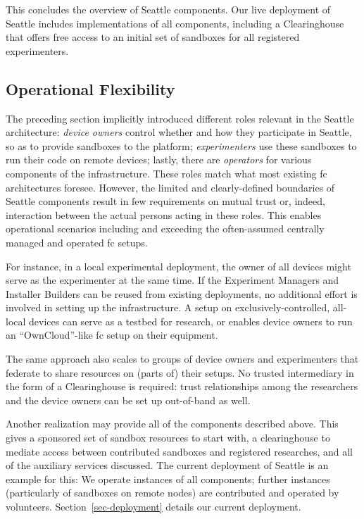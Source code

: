 This concludes the overview of Seattle components. Our live deployment
of Seattle includes implementations of all components, including a
Clearinghouse that offers free access to an initial set of sandboxes
for all registered experimenters.




\subsection{Operational Flexibility}\label{sec-op-flex}

The preceding section implicitly introduced different roles relevant
in the Seattle architecture:
\textit{device owners} control whether and how they participate
in Seattle, so as to provide sandboxes to the platform;
\textit{experimenters} use these sandboxes to run their code
on remote devices;
lastly, there are \textit{operators} for various components
of the infrastructure.
These roles match what most existing \gls{fc} architectures
foresee.
However, the limited and clearly-defined boundaries of Seattle
components result in few requirements on mutual trust or, indeed,
interaction between
the actual persons acting in these roles. This enables operational
scenarios including and exceeding the often-assumed centrally managed
and operated \gls{fc} setups.

For instance, in a local experimental deployment, the owner of all
devices might serve as the experimenter at the same time. If
the Experiment Managers and Installer Builders can be reused
from existing deployments, no additional effort is involved in
setting up the infrastructure.
A setup on exclusively-controlled, all-local devices can serve as
a testbed for research, or enables device owners to run an
``OwnCloud''-like \gls{fc} setup on their equipment.

The same approach also scales to groups of device owners and experimenters
that federate
to share resources on (parts of) their setups. No trusted
intermediary in the form of a Clearinghouse is required:
trust relationships among the researchers and the device owners
can be set up out-of-band as well.

Another realization may provide all of the components described above.
This gives a sponsored set of sandbox resources to start with,
a clearinghouse to mediate access between contributed sandboxes
and registered researches, and all of the auxiliary services
discussed. The current deployment of Seattle is an example for
this: We operate instances of all components; further instances
(particularly of sandboxes on remote nodes) are contributed and
operated by volunteers.
Section~\ref{sec-deployment} details our current deployment.

